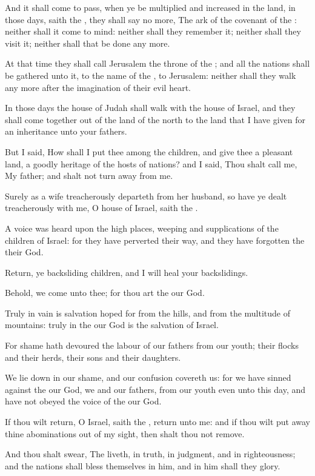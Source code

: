 \Verse And it shall come to pass, when ye be multiplied and increased in the land, in those days, saith the \LORD, they shall say no more, The ark of the covenant of the \LORD: neither shall it come to mind: neither shall they remember it; neither shall they visit it; neither shall that be done any more.

\Verse At that time they shall call Jerusalem the throne of the \LORD; and all the nations shall be gathered unto it, to the name of the \LORD, to Jerusalem: neither shall they walk any more after the imagination of their evil heart.

\Verse In those days the house of Judah shall walk with the house of Israel, and they shall come together out of the land of the north to the land that I have given for an inheritance unto your fathers.

\Verse But I said, How shall I put thee among the children, and give thee a pleasant land, a goodly heritage of the hosts of nations? and I said, Thou shalt call me, My father; and shalt not turn away from me.

\Verse Surely as a wife treacherously departeth from her husband, so have ye dealt treacherously with me, O house of Israel, saith the \LORD.

\Verse A voice was heard upon the high places, weeping and supplications of the children of Israel: for they have perverted their way, and they have forgotten the \LORD their God.

\Verse Return, ye backsliding children, and I will heal your backslidings.

Behold, we come unto thee; for thou art the \LORD our God.

\Verse Truly in vain is salvation hoped for from the hills, and from the multitude of mountains: truly in the \LORD our God is the salvation of Israel.

\Verse For shame hath devoured the labour of our fathers from our youth; their flocks and their herds, their sons and their daughters.

\Verse We lie down in our shame, and our confusion covereth us: for we have sinned against the \LORD our God, we and our fathers, from our youth even unto this day, and have not obeyed the voice of the \LORD our God.


\Chapter
\Verse If thou wilt return, O Israel, saith the \LORD, return unto me: and if thou wilt put away thine abominations out of my sight, then shalt thou not remove.

\Verse And thou shalt swear, The \LORD liveth, in truth, in judgment, and in righteousness; and the nations shall bless themselves in him, and in him shall they glory.

